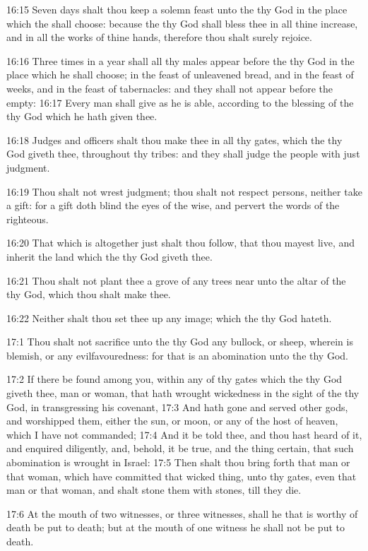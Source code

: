 16:15 Seven days shalt thou keep a solemn feast unto the \LORD thy God
in the place which the \LORD shall choose: because the \LORD thy God
shall bless thee in all thine increase, and in all the works of thine
hands, therefore thou shalt surely rejoice.

16:16 Three times in a year shall all thy males appear before the \LORD
thy God in the place which he shall choose; in the feast of unleavened
bread, and in the feast of weeks, and in the feast of tabernacles: and
they shall not appear before the \LORD empty: 16:17 Every man shall
give as he is able, according to the blessing of the \LORD thy God
which he hath given thee.

16:18 Judges and officers shalt thou make thee in all thy gates, which
the \LORD thy God giveth thee, throughout thy tribes: and they shall
judge the people with just judgment.

16:19 Thou shalt not wrest judgment; thou shalt not respect persons,
neither take a gift: for a gift doth blind the eyes of the wise, and
pervert the words of the righteous.

16:20 That which is altogether just shalt thou follow, that thou
mayest live, and inherit the land which the \LORD thy God giveth thee.

16:21 Thou shalt not plant thee a grove of any trees near unto the
altar of the \LORD thy God, which thou shalt make thee.

16:22 Neither shalt thou set thee up any image; which the \LORD thy God
hateth.

17:1 Thou shalt not sacrifice unto the \LORD thy God any bullock, or
sheep, wherein is blemish, or any evilfavouredness: for that is an
abomination unto the \LORD thy God.

17:2 If there be found among you, within any of thy gates which the
\LORD thy God giveth thee, man or woman, that hath wrought wickedness
in the sight of the \LORD thy God, in transgressing his covenant, 17:3
And hath gone and served other gods, and worshipped them, either the
sun, or moon, or any of the host of heaven, which I have not
commanded; 17:4 And it be told thee, and thou hast heard of it, and
enquired diligently, and, behold, it be true, and the thing certain,
that such abomination is wrought in Israel: 17:5 Then shalt thou bring
forth that man or that woman, which have committed that wicked thing,
unto thy gates, even that man or that woman, and shalt stone them with
stones, till they die.

17:6 At the mouth of two witnesses, or three witnesses, shall he that
is worthy of death be put to death; but at the mouth of one witness he
shall not be put to death.

